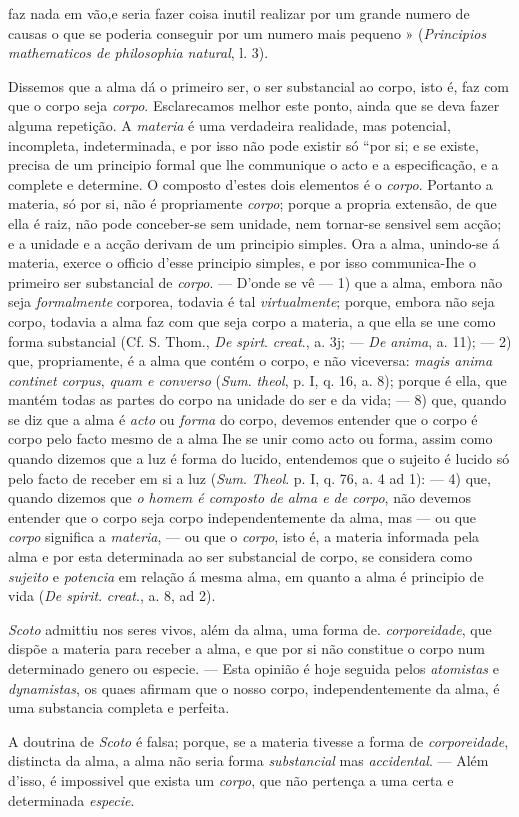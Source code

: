 faz nada em vão,e seria fazer coisa inutil realizar por um grande numero de causas o que se poderia conseguir por um numero mais pequeno » (\emph{Principios mathematicos de philosophia natural}, l. 3).\par Dissemos que a alma dá o primeiro ser, o ser substancial ao corpo, isto é, faz com que o corpo seja \emph{corpo}. Esclarecamos melhor este ponto, ainda que se deva fazer alguma repetição. A \emph{materia} é uma verdadeira realidade, mas potencial, incompleta, indeterminada, e por isso não pode existir só “por si; e se existe, precisa de um principio formal que lhe communique o acto e a especificação, e a complete e determine. O composto d'estes dois elementos é o \emph{corpo}. Portanto a materia, só por si, não é propriamente \emph{corpo}; porque a propria extensão, de que ella é raiz, não pode conceber-se sem unidade, nem tornar-se sensivel sem acção; e a unidade e a acção derivam de um principio simples. Ora a alma, unindo-se á materia, exerce o officio d'esse principio simples, e por isso communica-Ihe o primeiro ser substancial de \emph{corpo}. --- D'onde se vê --- 1) que a alma, embora não seja \emph{formalmente} corporea, todavia é tal \emph{virtualmente}; porque, embora não seja corpo, todavia a alma faz com que seja corpo a materia, a que ella se une como forma substancial (Cf. S. Thom., \emph{De spirt}. \emph{creat}., a. 3j; --- \emph{De anima}, a. 11); --- 2) que, propriamente, é a alma que contém o corpo, e não viceversa: \emph{magis anima continet corpus}, \emph{quam e converso} (\emph{Sum}. \emph{theol}, p. I, q. 16, a. 8); porque é ella, que mantém todas as partes do corpo na unidade do ser e da vida; --- 8) que, quando se diz que a alma é \emph{acto} ou \emph{forma} do corpo, devemos entender que o corpo é corpo pelo facto mesmo de a alma Ihe se unir como acto ou forma, assim como quando dizemos que a luz é forma do lucido, entendemos que o sujeito é lucido só pelo facto de receber em si a luz (\emph{Sum}. \emph{Theol}. p. I, q. 76, a. 4 ad 1): --- 4) que, quando dizemos que \emph{o homem é composto de alma e de corpo}, não devemos entender que o corpo seja corpo independentemente da alma, mas --- ou que \emph{corpo} significa a \emph{materia}, --- ou que o \emph{corpo}, isto é, a materia informada pela alma e por esta determinada ao ser substancial de corpo, se considera como \emph{sujeito} e \emph{potencia} em relação á mesma alma, em quanto a alma é principio de vida (\emph{De spirit}. \emph{creat}., a. 8, ad 2).\par \emph{Scoto} admittiu nos seres vivos, além da alma, uma forma de. \emph{corporeidade}, que dispõe a materia para receber a alma, e que por si não constitue o corpo num determinado genero ou especie. --- Esta opinião é hoje seguida pelos \emph{atomistas} e \emph{dynamistas}, os quaes afirmam que o nosso corpo, independentemente da alma, é uma substancia completa e perfeita.\par A doutrina de \emph{Scoto} é falsa; porque, se a materia tivesse a forma de \emph{corporeidade}, distincta da alma, a alma não seria forma \emph{substancial} mas \emph{accidental}. --- Além d'isso, é impossivel que exista um \emph{corpo}, que não pertença a uma certa e determinada \emph{especie}.\par 